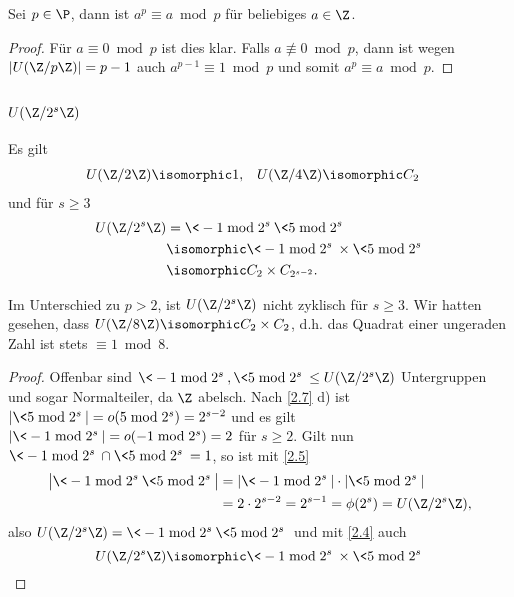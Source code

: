 \begin{lem} \label{2.9}
	Sei $p \in \P$, dann ist $a^p \equiv a \bmod p$ für beliebiges $a \in \Z$.
	\begin{proof}
		Für $a \equiv 0 \bmod p$ ist dies klar.
		Falls $a \not\equiv 0 \bmod p$, dann ist wegen $|U(\Z / p\Z)| = p - 1$ auch $a^{p-1} \equiv 1 \bmod p$ und somit $a^p \equiv a \bmod p$.
	\end{proof}
\end{lem}

\subsection{\texorpdfstring{$U(\Z/2^s \Z)$}{U(ℤ/2\textasciicircum sℤ)}}

\begin{st} \label{2.10}
	Es gilt
	\begin{align*}
		U(\Z / 2 \Z) &\isomorphic 1, &
		U(\Z / 4 \Z) &\isomorphic C_2
	\end{align*}
	und für $s \ge 3$
	\begin{align*}
		U(\Z / 2^s \Z)
		&= \< -1 \bmod 2^s \> \< 5 \bmod 2^s \> \\
		&\isomorphic \< - 1 \bmod 2^s \> \times \< 5 \bmod 2^s \> \\
		&\isomorphic C_2 \times C_{2^{s-2}}.
	\end{align*}
	\begin{note}
		Im Unterschied zu $p > 2$, ist $U(\Z / 2^s \Z)$ nicht zyklisch für $s \ge 3$.
		Wir hatten gesehen, dass $U(\Z / 8 \Z) \isomorphic C_2 \times C_2$, d.h. das Quadrat einer ungeraden Zahl ist stets $\equiv 1 \bmod 8$.
	\end{note}
	\begin{proof}
		Offenbar sind $\< -1 \bmod 2^s\>, \<5 \bmod 2^s\> \le U(\Z / 2^s \Z)$ Untergruppen und sogar Normalteiler, da $\Z$ abelsch.
		Nach \ref{2.7} d) ist $|\<5 \bmod 2^s\>| = o(5 \bmod 2^s) = 2^{s-2}$ und es gilt $|\< -1 \bmod 2^s\>| = o(-1 \bmod 2^s) = 2$ für $s \ge 2$.
		Gilt nun $\<-1 \bmod 2^s\> \cap \<5 \bmod 2^s\> = 1$, so ist mit \ref{2.5}
		\begin{align*}
			\big|\<-1 \bmod 2^s\> \<5 \bmod 2^s\> \big|
			&= |\<-1 \bmod 2^s\>| \cdot |\<5 \bmod 2^s\>| \\
			&= 2 \cdot 2^{s-2}
			= 2^{s-1}
			= \phi(2^s)
			= U(\Z / 2^s \Z),
		\end{align*}
		also $U(\Z / 2^s \Z) = \<-1 \bmod 2^s\> \<5 \bmod 2^s\>$ und mit \ref{2.4} auch
		\[
			U(\Z / 2^s \Z) \isomorphic \<-1 \bmod 2^s\> \times \<5 \bmod 2^s\>
\]
\end{proof}
\end{st}

